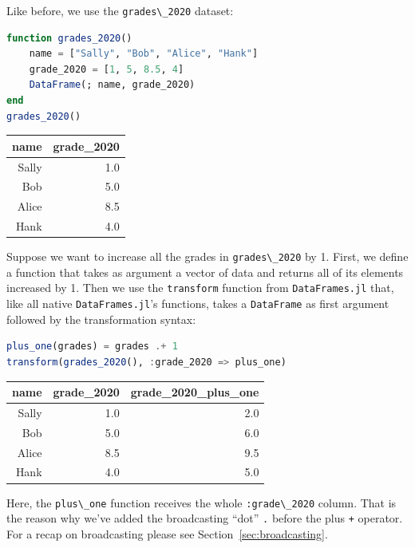 \documentclass[
  notoc %
]{tufte-book}
\newcommand{\passthrough}[1]{#1}
\begin{document}
Like before, we use the \passthrough{\lstinline!grades\_2020!} dataset:

\begin{lstlisting}[language=Julia]
function grades_2020()
    name = ["Sally", "Bob", "Alice", "Hank"]
    grade_2020 = [1, 5, 8.5, 4]
    DataFrame(; name, grade_2020)
end
grades_2020()
\end{lstlisting}

\begin{longtable}[]{@{}rr@{}}
\toprule
name & grade\_2020 \\
\midrule
\endhead
Sally & 1.0 \\
Bob & 5.0 \\
Alice & 8.5 \\
Hank & 4.0 \\
\bottomrule
\end{longtable}

Suppose we want to increase all the grades in
\passthrough{\lstinline!grades\_2020!} by 1. First, we define a function
that takes as argument a vector of data and returns all of its elements
increased by 1. Then we use the \passthrough{\lstinline!transform!}
function from \passthrough{\lstinline!DataFrames.jl!} that, like all
native \passthrough{\lstinline!DataFrames.jl!}'s functions, takes a
\passthrough{\lstinline!DataFrame!} as first argument followed by the
transformation syntax:

\begin{lstlisting}[language=Julia]
plus_one(grades) = grades .+ 1
transform(grades_2020(), :grade_2020 => plus_one)
\end{lstlisting}

\begin{longtable}[]{@{}rrr@{}}
\toprule
name & grade\_2020 & grade\_2020\_plus\_one \\
\midrule
\endhead
Sally & 1.0 & 2.0 \\
Bob & 5.0 & 6.0 \\
Alice & 8.5 & 9.5 \\
Hank & 4.0 & 5.0 \\
\bottomrule
\end{longtable}

Here, the \passthrough{\lstinline!plus\_one!} function receives the
whole \passthrough{\lstinline!:grade\_2020!} column. That is the reason
why we've added the broadcasting ``dot'' \passthrough{\lstinline!.!}
before the plus \passthrough{\lstinline!+!} operator. For a recap on
broadcasting please see Section~\ref{sec:broadcasting}.
\end{document}

